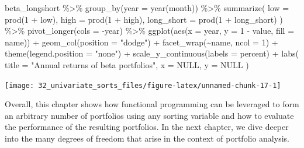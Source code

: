 \documentclass[
]{krantz}
\newenvironment{Shaded}{\begin{snugshade}}{\end{snugshade}}
\newcommand{\AttributeTok}[1]{\textcolor[rgb]{0.61,0.61,0.61}{#1}}
\newcommand{\ConstantTok}[1]{\textcolor[rgb]{0,0,0}{#1}}
\newcommand{\DecValTok}[1]{\textcolor[rgb]{0.06,0.06,0.06}{#1}}
\newcommand{\FunctionTok}[1]{\textcolor[rgb]{0,0,0}{#1}}
\newcommand{\NormalTok}[1]{#1}
\newcommand{\SpecialCharTok}[1]{\textcolor[rgb]{0,0,0}{#1}}
\newcommand{\StringTok}[1]{\textcolor[rgb]{0.5,0.5,0.5}{#1}}
\begin{document}
\begin{Shaded}
\begin{Highlighting}[]
\NormalTok{beta\_longshort }\SpecialCharTok{\%\textgreater{}\%}
  \FunctionTok{group\_by}\NormalTok{(}\AttributeTok{year =} \FunctionTok{year}\NormalTok{(month)) }\SpecialCharTok{\%\textgreater{}\%}
  \FunctionTok{summarize}\NormalTok{(}
    \AttributeTok{low =} \FunctionTok{prod}\NormalTok{(}\DecValTok{1} \SpecialCharTok{+}\NormalTok{ low),}
    \AttributeTok{high =} \FunctionTok{prod}\NormalTok{(}\DecValTok{1} \SpecialCharTok{+}\NormalTok{ high),}
    \AttributeTok{long\_short =} \FunctionTok{prod}\NormalTok{(}\DecValTok{1} \SpecialCharTok{+}\NormalTok{ long\_short)}
\NormalTok{  ) }\SpecialCharTok{\%\textgreater{}\%}
  \FunctionTok{pivot\_longer}\NormalTok{(}\AttributeTok{cols =} \SpecialCharTok{{-}}\NormalTok{year) }\SpecialCharTok{\%\textgreater{}\%}
  \FunctionTok{ggplot}\NormalTok{(}\FunctionTok{aes}\NormalTok{(}\AttributeTok{x =}\NormalTok{ year, }\AttributeTok{y =} \DecValTok{1} \SpecialCharTok{{-}}\NormalTok{ value, }\AttributeTok{fill =}\NormalTok{ name)) }\SpecialCharTok{+}
  \FunctionTok{geom\_col}\NormalTok{(}\AttributeTok{position =} \StringTok{"dodge"}\NormalTok{) }\SpecialCharTok{+}
  \FunctionTok{facet\_wrap}\NormalTok{(}\SpecialCharTok{\textasciitilde{}}\NormalTok{name, }\AttributeTok{ncol =} \DecValTok{1}\NormalTok{) }\SpecialCharTok{+}
  \FunctionTok{theme}\NormalTok{(}\AttributeTok{legend.position =} \StringTok{"none"}\NormalTok{) }\SpecialCharTok{+}
  \FunctionTok{scale\_y\_continuous}\NormalTok{(}\AttributeTok{labels =}\NormalTok{ percent) }\SpecialCharTok{+}
  \FunctionTok{labs}\NormalTok{(}
    \AttributeTok{title =} \StringTok{"Annual returns of beta portfolios"}\NormalTok{,}
    \AttributeTok{x =} \ConstantTok{NULL}\NormalTok{, }\AttributeTok{y =} \ConstantTok{NULL}
\NormalTok{  )}
\end{Highlighting}
\end{Shaded}

\begin{center}\texttt{[image: 32\_univariate\_sorts\_files/figure-latex/unnamed-chunk-17-1]} \end{center}

Overall, this chapter shows how functional programming can be leveraged to form an arbitrary number of portfolios using any sorting variable and how to evaluate the performance of the resulting portfolios. In the next chapter, we dive deeper into the many degrees of freedom that arise in the context of portfolio analysis.
\end{document}
